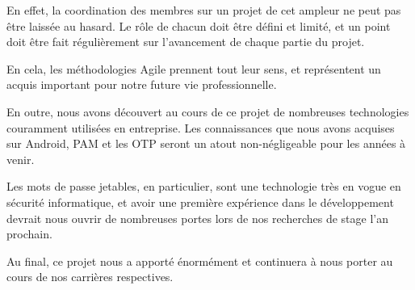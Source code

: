 En effet, la coordination des membres sur un projet de cet ampleur ne peut pas être laissée au hasard. Le rôle de chacun doit être défini et limité, et un point doit être fait régulièrement sur l'avancement de chaque partie du projet.

En cela, les méthodologies Agile prennent tout leur sens, et représentent un acquis important pour notre future vie professionnelle.

En outre, nous avons découvert au cours de ce projet de nombreuses technologies couramment utilisées en entreprise. Les connaissances que nous avons acquises sur Android, PAM et les OTP seront un atout non-négligeable pour les années à venir.

Les mots de passe jetables, en particulier, sont une technologie très en vogue en sécurité informatique, et avoir une première expérience dans le développement devrait nous ouvrir de nombreuses portes lors de nos recherches de stage l'an prochain.

Au final, ce projet nous a apporté énormément et continuera à nous porter au cours de nos carrières respectives.
